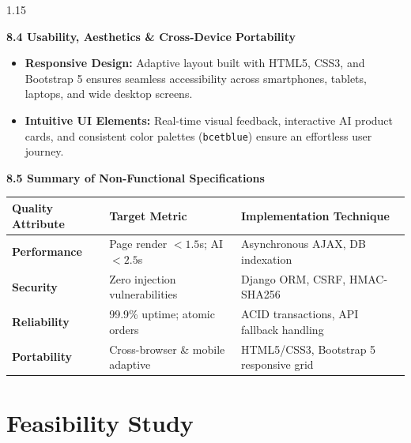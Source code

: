 \documentclass[12pt,a4paper]{article}
\begin{document}
{\begin{spacing}{1.15}
\vspace{0.08in}

\noindent
\textbf{8.4 Usability, Aesthetics \& Cross-Device Portability}
\begin{itemize}
    \setlength{\itemsep}{1.5pt}
    \item \textbf{Responsive Design:} Adaptive layout built with HTML5, CSS3, and Bootstrap 5 ensures seamless accessibility across smartphones, tablets, laptops, and wide desktop screens.
    \item \textbf{Intuitive UI Elements:} Real-time visual feedback, interactive AI product cards, and consistent color palettes (\texttt{bcetblue}) ensure an effortless user journey.
\end{itemize}

\vspace{0.08in}

\noindent
\textbf{8.5 Summary of Non-Functional Specifications}

\vspace{0.04in}

\begin{center}
\renewcommand{\arraystretch}{1.2}
\fontsize{10.5}{14}\selectfont
\begin{tabular}{|p{1.7in}|p{2.2in}|p{2.6in}|}
\hline
\textbf{Quality Attribute} & \textbf{Target Metric} & \textbf{Implementation Technique} \\ \hline
\textbf{Performance} & Page render $< 1.5$s; AI $< 2.5$s & Asynchronous AJAX, DB indexation \\ \hline
\textbf{Security} & Zero injection vulnerabilities & Django ORM, CSRF, HMAC-SHA256 \\ \hline
\textbf{Reliability} & 99.9\% uptime; atomic orders & ACID transactions, API fallback handling \\ \hline
\textbf{Portability} & Cross-browser \& mobile adaptive & HTML5/CSS3, Bootstrap 5 responsive grid \\ \hline
\end{tabular}
\end{center}

\end{spacing}
}

\vfill

\newpage


\section{Feasibility Study}
\end{document}
